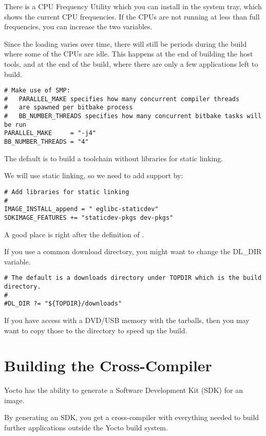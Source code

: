 There is a CPU Frequency Utility which you can install in the system tray,
which shows the current CPU frequencies.
If the CPUs are not running at less than full frequencies, you can increase
the two variables.

Since the loading varies over time, there will still be periods during
the build where some of the CPUs are idle.  This happens at the end of 
building the host tools, and at the end of the build, where there are only
a few applications left to build.
\clearpage
\begin{verbatim}
# Make use of SMP:
#   PARALLEL_MAKE specifies how many concurrent compiler threads 
#	are spawned per bitbake process
#   BB_NUMBER_THREADS specifies how many concurrent bitbake tasks will be run
PARALLEL_MAKE     = "-j4"
BB_NUMBER_THREADS = "4"
\end{verbatim}

The default is to build a toolchain without libraries for static linking.

We will use static linking, so we need to add support by:

\begin{verbatim}
# Add libraries for static linking
#
IMAGE_INSTALL_append = " eglibc-staticdev"
SDKIMAGE_FEATURES += "staticdev-pkgs dev-pkgs"
\end{verbatim}

A good place is right after the definition of .

If you use a common download directory, you might want to  change the DL\_DIR variable.

\begin{verbatim}
# The default is a downloads directory under TOPDIR which is the build directory.
#
#DL_DIR ?= "${TOPDIR}/downloads"
\end{verbatim}

If you have access with a DVD/USB memory with the tarballs, then you may
want to copy those to the  directory to speed up the build.

\section{Building the Cross-Compiler}

Yocto has the ability to generate a Software Development Kit (SDK) for an image.

By generating an SDK, you get a cross-compiler with everything needed to build 
further applications outside the Yocto build system.

